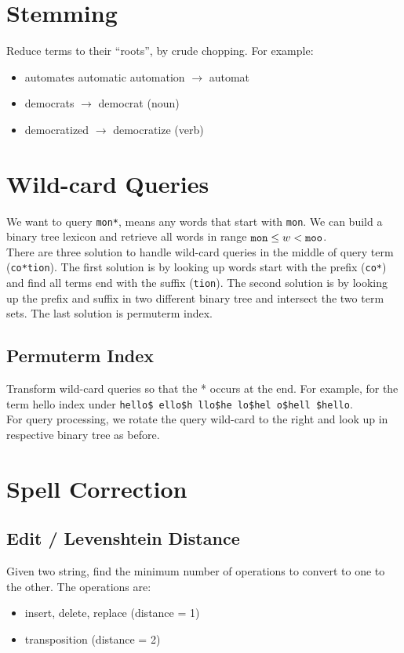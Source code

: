 \begin{multicols*}{2}
\section{Stemming}
\noindent Reduce terms to their “roots”, by crude chopping. For example:
\begin{itemize}
    \item automates automatic automation $\rightarrow$ automat
    \item democrats $\rightarrow$ democrat (noun)
    \item democratized $\rightarrow$ democratize (verb)
\end{itemize}

\section{Wild-card Queries}
\noindent We want to query \verb|mon*|, means any words that start with \verb|mon|. We can build a binary tree lexicon and retrieve all words in range $\verb|mon|\le w < \verb|moo|$. \\

\noindent There are three solution to handle wild-card queries in the middle of query term (\verb|co*tion|). The first solution is by looking up words start with the prefix (\verb|co*|) and find all terms end with the suffix (\verb|tion|). The second solution is by looking up the prefix and suffix in two different binary tree and intersect the two term sets. The last solution is permuterm index. 

\subsection{Permuterm Index}
\noindent Transform wild-card queries so that the * occurs at the end. For example, for the term hello index under \verb|hello$ ello$h llo$he lo$hel o$hell $hello|. \\

\noindent For query processing, we rotate the query wild-card to the right and look up in respective binary tree as before. 

\section{Spell Correction}
\subsection{Edit / Levenshtein Distance}
\noindent Given two string, find the minimum number of operations to convert to one to the other. The operations are:
\begin{itemize}
    \item insert, delete, replace (distance = 1)
    \item transposition (distance = 2)
\end{itemize}


\end{multicols*}
